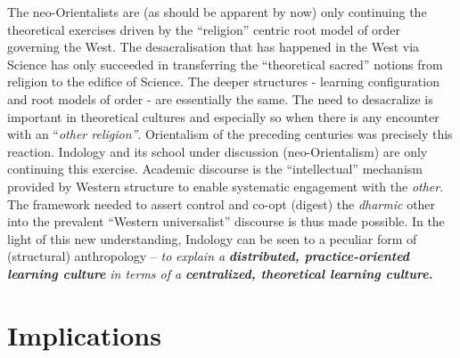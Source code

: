 The neo-Orientalists are (as should be apparent by now) only continuing the theoretical exercises driven by the “religion” centric root model of order governing the West. The desacralisation that has happened in the West via Science has only succeeded in transferring the “theoretical sacred” notions from religion to the edifice of Science. The deeper structures - learning configuration and root models of order - are essentially the same. The need to desacralize is important in theoretical cultures and especially so when there is any encounter with an “\textit{other religion”}. Orientalism of the preceding centuries was precisely this reaction. Indology and its school under discussion (neo-Orientalism) are only continuing this exercise. Academic discourse is the “intellectual” mechanism provided by Western structure to enable systematic engagement with the \textit{other}. The framework needed to assert control and co-opt (digest) the \textit{dharmic} other into the prevalent “Western universalist” discourse is thus made possible. In the light of this new understanding, Indology can be seen to a peculiar form of (structural) anthropology – \textit{to} \textit{explain a } \textbf{\textit{distributed, practice-oriented learning culture}} \textit{in terms of a} \textbf{\textit{centralized, theoretical learning culture.}}


\section*{Implications}

